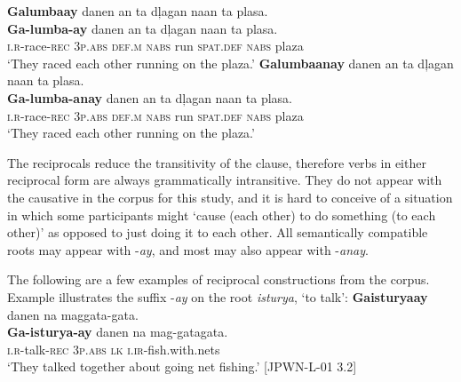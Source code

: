 \ea
\label{ex:reciprocal-1}
\textbf{Galumbaay}  danen  an  ta  dļagan  naan  ta  plasa. \\\smallskip
\gll \textbf{Ga-lumba-ay}  danen  an  ta  dļagan  naan  ta  plasa. \\
\textsc{i.r}-race-\textsc{rec}  3\textsc{p.abs}  \textsc{def.m}  \textsc{nabs}  run  \textsc{spat.def}  \textsc{nabs}  plaza \\
\glt ‘They raced each other running on the plaza.’
\z
\ea
\label{ex:reciprocal-2}
\textbf{Galumbaanay}  danen  an  ta  dļagan  naan  ta  plasa. \\\smallskip
\gll \textbf{Ga-lumba-anay}  danen  an  ta  dļagan  naan  ta  plasa. \\
\textsc{i.r}-race-\textsc{rec}  3\textsc{p.abs}  \textsc{def.m}  \textsc{nabs}  run  \textsc{spat.def}  \textsc{nabs}  plaza \\
\glt ‘They raced each other running on the plaza.’
\z

The reciprocals reduce the transitivity of the clause, therefore verbs in either reciprocal form are always grammatically intransitive. They do not appear with the causative in the corpus for this study, and it is hard to conceive of a situation in which some participants might `cause (each other) to do something (to each other)' as opposed to just doing it to each other. All semantically compatible roots may appear with -\textit{ay}, and most may also appear with -\textit{anay}. 

The following are a few examples of reciprocal constructions from the corpus. Example  illustrates the suffix -\textit{ay} on the root \textit{isturya}, `to talk':
\ea
\label{ex:netfishing}
\textbf{Gaisturyaay}  danen  na  maggata-gata. \\\smallskip
\gll \textbf{Ga-isturya-ay}  danen  na  mag-gatagata.\footnotemark \\
\textsc{i.r-}talk-\textsc{rec}  3\textsc{p.abs}  \textsc{lk}  \textsc{i.ir}-fish.with.nets \\
\glt ‘They talked together about going net fishing.’ [JPWN-L-01 3.2]
\z

